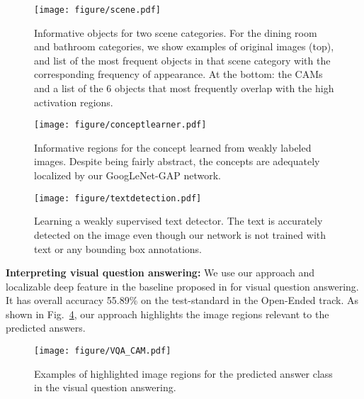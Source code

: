 \documentclass[10pt,twocolumn,letterpaper]{article}
\begin{document}
\begin{figure}
\begin{center}
\texttt{[image: figure/scene.pdf]}
\end{center}
\vspace*{-4mm}
\caption{Informative objects for two scene categories. For the dining room and bathroom categories, we show examples of original images (top), and list of the  most frequent objects in that scene category with the corresponding frequency of appearance. At the bottom: the CAMs and a list of the 6 objects that most frequently overlap with the high activation regions.}
\label{fig:scene}
\end{figure}

\begin{figure}
\begin{center}
\texttt{[image: figure/conceptlearner.pdf]}
\end{center}
\vspace*{-4mm}
\caption{Informative regions for the concept learned from weakly labeled images. Despite being fairly abstract, the concepts are adequately localized by our GoogLeNet-GAP network.}
\label{fig:conceptlearner}
\end{figure}

\begin{figure}
\begin{center}
\texttt{[image: figure/textdetection.pdf]}
\end{center}
\vspace*{-4mm}
\caption{Learning a weakly supervised text detector. The text is accurately detected on the image even though our network is not trained with  text or any bounding box annotations.}
\label{fig:textdetection}
\end{figure}

 
 \textbf{Interpreting visual question answering:} We use our approach and localizable deep feature in the baseline proposed in \cite{zhou2015vqa} for visual question answering. It has overall accuracy 55.89\% on the test-standard in the Open-Ended track. As shown in Fig.~\ref{fig:vqa}, our approach highlights the image regions relevant to the predicted answers.

\begin{figure}
\begin{center}
\texttt{[image: figure/VQA\_CAM.pdf]}
\end{center}
\caption{Examples of highlighted image regions for the predicted answer class in the visual question answering.}
\label{fig:vqa}
\end{figure}
\end{document}
